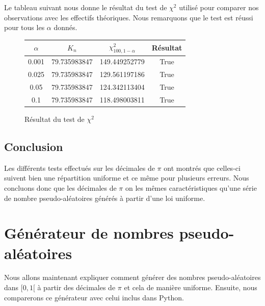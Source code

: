 \documentclass[10pt,a4paper]{article}
\begin{document}
Le tableau suivant nous donne le résultat du test de $\chi^2$ utilisé pour comparer nos observations avec les effectifs théoriques. Nous remarquons que le test est réussi pour tous les $\alpha$ donnés.
\begin{figure}[H]
\begin{center}
\begin{tabular}{|c|c|c|c|}
\hline
$\alpha$ & $K_{n}$ & $\chi^2_{100, 1 - \alpha}$ & Résultat\\
\hline
0.001 & 79.735983847 & 149.449252779 & True\\
0.025 & 79.735983847 & 129.561197186 & True\\
0.05 & 79.735983847 & 124.342113404 & True\\
0.1 & 79.735983847 & 118.498003811 & True\\
\hline
\end{tabular}
\end{center}
\caption{Résultat du test de $\chi^2$}
\end{figure} 

\newpage

\subsection{Conclusion}
Les différents tests effectués sur les décimales de $\pi$ ont montrés que celles-ci suivent bien une répartition uniforme et ce même pour plusieurs erreurs. Nous concluons donc que les décimales de $\pi$ on les mêmes caractéristiques qu'une série de nombre pseudo-aléatoires générés à partir d'une loi uniforme. 

\section{Générateur de nombres pseudo-aléatoires}
Nous allons maintenant expliquer comment générer des nombres pseudo-aléatoires dans $[0, 1[$ à partir des décimales de $\pi$ et cela de manière uniforme. Ensuite, nous comparerons ce générateur avec celui inclus dans Python.
\end{document}
